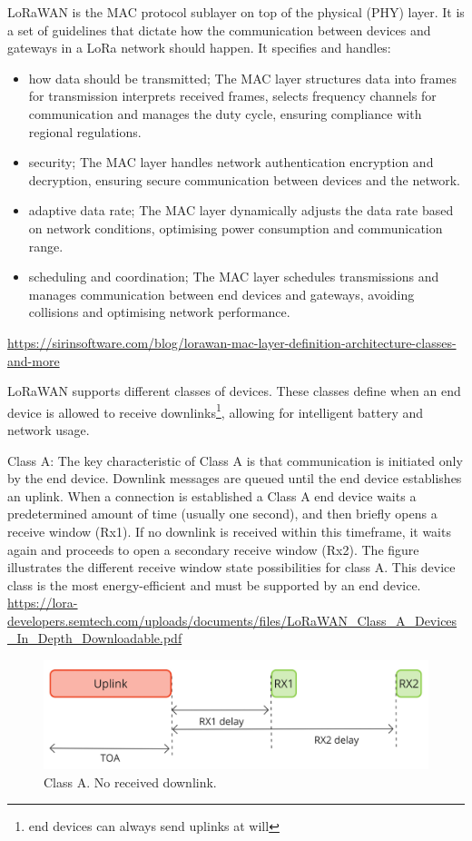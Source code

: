 \ac{LoRaWAN} is the \ac{MAC} protocol sublayer on top of the physical (PHY) layer. It is a set of guidelines that dictate how the communication between devices and gateways in a LoRa network should happen. It specifies and handles:
\begin{itemize}
    \item how data should be transmitted; The \ac{MAC} layer structures data into frames for transmission interprets received frames, selects frequency channels for communication and manages the duty cycle, ensuring compliance with regional regulations.
    \item security; The \ac{MAC} layer handles network authentication encryption and decryption, ensuring secure communication between devices and the network.
    \item adaptive data rate; The \ac{MAC} layer dynamically adjusts the data rate based on network conditions, optimising power consumption and communication range.
    \item scheduling and coordination; The \ac{MAC} layer schedules transmissions and manages communication between end devices and gateways, avoiding collisions and optimising network performance.
\end{itemize}

\url{https://sirinsoftware.com/blog/lorawan-mac-layer-definition-architecture-classes-and-more}

\ac{LoRaWAN} supports different classes of devices. These classes define when an end device is allowed to receive downlinks\footnote{end devices can always send uplinks at will}, allowing for intelligent battery and network usage.

Class A: The key characteristic of Class A is that communication is initiated only by the end device. Downlink messages are queued until the end device establishes an uplink. When a connection is established a Class A end device waits a predetermined amount of time (usually one second), and then briefly opens a receive window (Rx1). If no downlink is received within this timeframe, it waits again and proceeds to open a secondary receive window (Rx2). The figure illustrates the different receive window state possibilities for class A. 
This device class is the most energy-efficient and must be supported by an end device.
\url{https://lora-developers.semtech.com/uploads/documents/files/LoRaWAN_Class_A_Devices_In_Depth_Downloadable.pdf}

\begin{figure}[H]
    \centering
    \includegraphics[width=0.7\linewidth]{figures/ClassA_1.jpg}
    \caption{Class A. No received downlink.}
    \label{fig:ClassA-no}
\end{figure}

